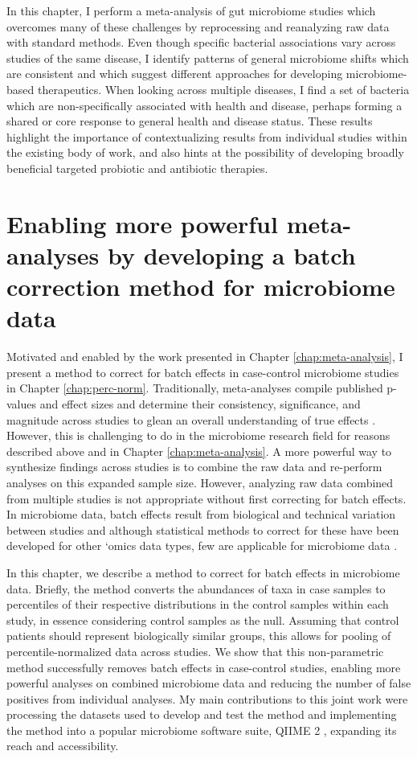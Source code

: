 In this chapter, I perform a meta-analysis of gut microbiome studies which overcomes many of these challenges by reprocessing and reanalyzing raw data with standard methods.
Even though specific bacterial associations vary across studies of the same disease, I identify patterns of general microbiome shifts which are consistent  and which suggest different approaches for developing microbiome-based therapeutics.
When looking across multiple diseases, I find a set of bacteria which are non-specifically associated with health and disease, perhaps forming a shared or core response to general health and disease status.
These results highlight the importance of contextualizing results from individual studies within the existing body of work, and also hints at the possibility of developing broadly beneficial targeted probiotic and antibiotic therapies.

\section{Enabling more powerful meta-analyses by developing a batch correction method for microbiome data}

Motivated and enabled by the work presented in Chapter \ref{chap:meta-analysis}, I present a method to correct for batch effects in case-control microbiome studies in Chapter \ref{chap:perc-norm}.
Traditionally, meta-analyses compile published p-values and effect sizes and determine their consistency, significance, and magnitude across studies to glean an overall understanding of true effects \cite{glass-1976}.
However, this is challenging to do in the microbiome research field for reasons described above and in Chapter \ref{chap:meta-analysis}.
A more powerful way to synthesize findings across studies is to combine the raw data and re-perform analyses on this expanded sample size.
However, analyzing raw data combined from multiple studies is not appropriate without first correcting for batch effects.
In microbiome data, batch effects result from biological and technical variation between studies and although statistical methods to correct for these have been developed for other `omics data types, few are applicable for microbiome data \cite{gibbons-2018}.

In this chapter, we describe a method to correct for batch effects in microbiome data.
Briefly, the method converts the abundances of taxa in case samples to percentiles of their respective distributions in the control samples within each study, in essence considering control samples as the null.
Assuming that control patients should represent biologically similar groups, this allows for pooling of percentile-normalized data across studies.
We show that this non-parametric method successfully removes batch effects in case-control studies, enabling more powerful analyses on combined microbiome data and reducing the number of false positives from individual analyses.
My main contributions to this joint work were processing the datasets used to develop and test the method and implementing the method into a popular microbiome software suite, QIIME 2 \cite{qiime2}, expanding its reach and accessibility.

